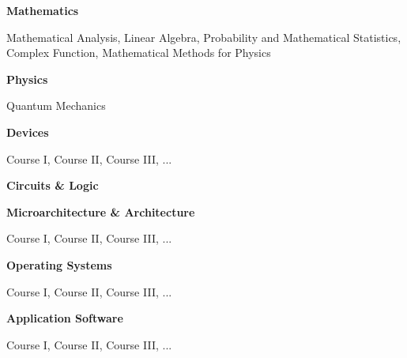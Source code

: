 
\newcommand{\levelentry}[1]{\item \textbf{#1}}
\newenvironment{cvcourses}
{
    \begin{cvlist}\item
    \small
}
{
    \normalsize
    \end{cvlist}
}

\begin{cvlist}
    \levelentry{Mathematics}
    \begin{cvcourses}
        Mathematical Analysis, Linear Algebra, Probability and Mathematical Statistics,
        Complex Function, Mathematical Methods for Physics
    \end{cvcourses}

    \levelentry{Physics}
    \begin{cvcourses}
        Quantum Mechanics
    \end{cvcourses}
    
    \levelentry{Devices}
    \begin{cvcourses}
        Course I, Course II, Course III, ...
    \end{cvcourses}



    \levelentry{Circuits \& Logic}

    \levelentry{Microarchitecture \& Architecture}
    \begin{cvcourses}
        Course I, Course II, Course III, ...
    \end{cvcourses}

    \levelentry{Operating Systems}
    \begin{cvcourses}
        Course I, Course II, Course III, ...
    \end{cvcourses}

    \levelentry{Application Software}
    \begin{cvcourses}
        Course I, Course II, Course III, ...
    \end{cvcourses}

\end{cvlist}

\endinput